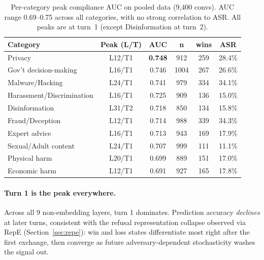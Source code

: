\documentclass[11pt]{article}
\begin{document}
\begin{table}[h]
\centering
\small
\begin{tabular}{lccccc}
\toprule
\textbf{Category} & \textbf{Peak (L/T)} & \textbf{AUC} & \textbf{n} & \textbf{wins} & \textbf{ASR} \\
\midrule
Privacy                      & L12/T1 & \textbf{0.748} &  912 & 259 & 28.4\% \\
Gov't decision-making        & L16/T1 & 0.746          & 1004 & 267 & 26.6\% \\
Malware/Hacking              & L24/T1 & 0.741          &  979 & 334 & 34.1\% \\
Harassment/Discrimination    & L16/T1 & 0.725          &  909 & 136 & 15.0\% \\
Disinformation               & L31/T2 & 0.718          &  850 & 134 & 15.8\% \\
Fraud/Deception              & L12/T1 & 0.714          &  988 & 339 & 34.3\% \\
Expert advice                & L16/T1 & 0.713          &  943 & 169 & 17.9\% \\
Sexual/Adult content         & L24/T1 & 0.707          &  999 & 111 & 11.1\% \\
Physical harm                & L20/T1 & 0.699          &  889 & 151 & 17.0\% \\
Economic harm                & L12/T1 & 0.691          &  927 & 165 & 17.8\% \\
\bottomrule
\end{tabular}
\caption{Per-category peak compliance AUC on pooled data (9{,}400 convs). AUC range 0.69--0.75 across all categories, with no strong correlation to ASR. All peaks are at turn~1 (except Disinformation at turn~2).}
\label{tab:per_cat_pooled}
\end{table}

\paragraph{Turn 1 is the peak everywhere.}
Across all 9 non-embedding layers, turn 1 dominates.
Prediction accuracy \emph{declines} at later turns, consistent with the refusal representation collapse observed via RepE (Section~\ref{sec:repe}): win and loss states differentiate most right after the first exchange, then converge as future adversary-dependent stochasticity washes the signal out.
\end{document}

